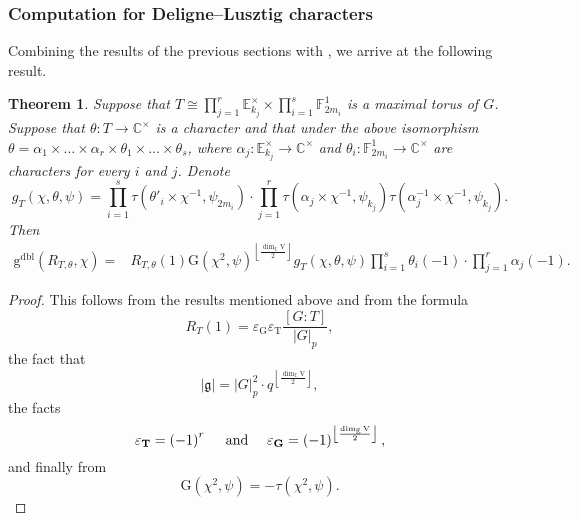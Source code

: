 \documentclass[12pt, reqno]{amsart}
\newtheorem{theorem}{Theorem}[section]
\theoremstyle{definition}
\theoremstyle{definition}
\theoremstyle{definition}
\newcommand{\cComplex}{\mathbb{C}}
\newcommand{\multiplicativegroup}[1]{#1^{\times}}
\newcommand{\sizeof}[1]{\left|#1\right|}
\newcommand{\hermitianSpace}{\mathrm{V}}
\newcommand{\fieldCharacter}{\psi}
\newcommand{\grpIndex}[2]{\left[#1:#2\right]}
\newcommand{\finiteField}{\mathbb{F}}
\newcommand{\quadraticExtension}{\mathbb{E}}
\newcommand{\finiteFieldExtension}[1]{\finiteField_{#1}}
\newcommand{\quadraticFieldExtension}[1]{\quadraticExtension_{#1}}
\newcommand{\GaussSumScalar}[2]{\mathrm{G}\left(#1, #2\right)}
\newcommand{\dblVirtualGaussSumScalar}[2]{\mathrm{g}^{\mathrm{dbl}}\left(#1, #2\right)}
\newcommand{\GaussSumCharacter}[3]{\tau\left(#1 \times #2, #3\right)}
\newcommand{\lieAlgebra}{\mathfrak{g}}
\newcommand{\algebraicGroup}[1]{\boldsymbol{\mathrm{#1}}}
\begin{document}
\subsubsection{Computation for Deligne--Lusztig characters}
Combining the results of the previous sections with , we arrive at the following result.

\begin{theorem}\label{thm:computation-of-doubling-gauss-sum-scalar-for-deligne-lusztig-characters}
	Suppose that $T \cong \prod_{j=1}^r \multiplicativegroup{\quadraticFieldExtension{k_j}} \times \prod_{i=1}^s \finiteFieldExtension{2m_i}^1$ is a maximal torus of $G$. Suppose that $\theta \colon T \to \multiplicativegroup{\cComplex}$ is a character and that under the above isomorphism $\theta = \alpha_1 \times \dots \times \alpha_r \times \theta_1 \times \dots \times \theta_s$, where $\alpha_j \colon \multiplicativegroup{\quadraticFieldExtension{k_j}} \to \multiplicativegroup{\cComplex}$ and $\theta_i \colon \finiteFieldExtension{2m_i}^1 \to \multiplicativegroup{\cComplex}$ are characters for every $i$ and $j$. Denote $$g_T\left(\chi, \theta, \fieldCharacter\right) = \prod_{i=1}^s \GaussSumCharacter{\theta'_i}{\chi^{-1}}{\fieldCharacter_{2m_i}} \cdot  \prod_{j=1}^r \GaussSumCharacter{\alpha_j}{\chi^{-1}}{\fieldCharacter_{k_j}} \GaussSumCharacter{\alpha_j^{-1}}{\chi^{-1}}{\fieldCharacter_{k_j}}.$$ Then
	\begin{align*}
		 \dblVirtualGaussSumScalar{R_{T, \theta}}{\chi} =& R_{T,\theta}\left(1\right) \GaussSumScalar{\chi^2}{\fieldCharacter}^{\left\lfloor\frac{\dim_{\quadraticExtension} \hermitianSpace}{2}\right\rfloor} g_T\left(\chi, \theta, \fieldCharacter\right) \prod_{i=1}^s \theta_i\left(-1\right) \cdot \prod_{j=1}^r \alpha_j\left(-1\right).
	\end{align*}
\end{theorem}
\begin{proof}
	This follows from the results mentioned above and from the formula $$R_T\left(1\right) = \varepsilon_{\algebraicGroup{G}} \varepsilon_{\algebraicGroup{T}} \frac{\grpIndex{G}{T}}{\sizeof{G}_p},$$ the fact that $$ \sizeof{\lieAlgebra} = \sizeof{G}_p^2 \cdot q^{\left\lfloor\frac{\dim_{\quadraticExtension} \hermitianSpace}{2}\right\rfloor},$$
	the facts \begin{equation*}
		\varepsilon_{\algebraicGroup{T}} = \left(-1\right)^r \text{\,\,\,\,\,\, and \,\,\,\,\,\,}  \varepsilon_{\algebraicGroup{G}} = \left(-1\right)^{\left\lfloor\frac{\dim_{\quadraticExtension} \hermitianSpace}{2}\right\rfloor},
	\end{equation*}
	and finally from $$\GaussSumScalar{\chi^2}{\fieldCharacter} = -\tau\left(\chi^2, \fieldCharacter\right).$$
\end{proof}
\end{document}
